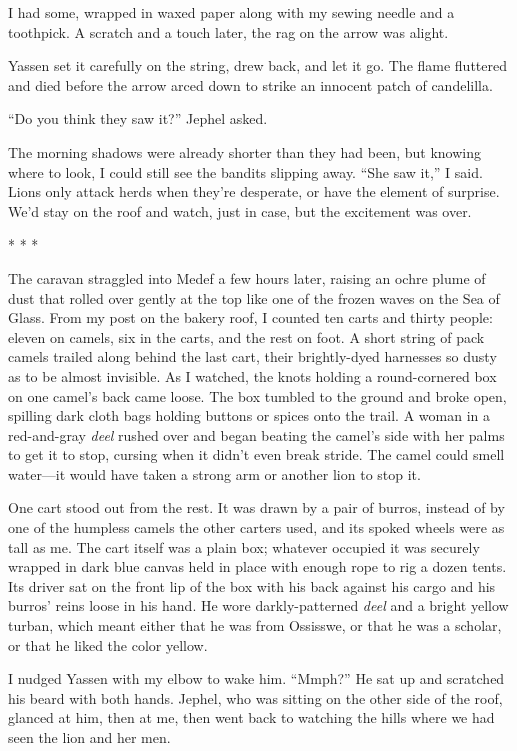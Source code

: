 I had some, wrapped in waxed paper along with my sewing needle and a
toothpick.  A scratch and a touch later, the rag on the arrow was
alight.

Yassen set it carefully on the string, drew back, and let it go.  The
flame fluttered and died before the arrow arced down to strike an
innocent patch of candelilla.

``Do you think they saw it?'' Jephel asked.

The morning shadows were already shorter than they had been, but
knowing where to look, I could still see the bandits slipping away.
``She saw it,'' I said.  Lions only attack herds when they're desperate,
or have the element of surprise.  We'd stay on the roof and watch,
just in case, but the excitement was over.

\begin{center}* * *\end{center}

The caravan straggled into Medef a few hours later, raising an ochre
plume of dust that rolled over gently at the top like one of the
frozen waves on the Sea of Glass.  From my post on the bakery roof, I
counted ten carts and thirty people: eleven on camels, six in the
carts, and the rest on foot.  A short string of pack camels trailed
along behind the last cart, their brightly-dyed harnesses so dusty as
to be almost invisible.  As I watched, the knots holding a
round-cornered box on one camel's back came loose.  The box tumbled to
the ground and broke open, spilling dark cloth bags holding buttons or
spices onto the trail.  A woman in a red-and-gray \emph{deel} rushed over
and began beating the camel's side with her palms to get it to stop,
cursing when it didn't even break stride.  The camel could smell
water---it would have taken a strong arm or another lion to stop it.

One cart stood out from the rest.  It was drawn by a pair of burros,
instead of by one of the humpless camels the other carters used, and
its spoked wheels were as tall as me.  The cart itself was a plain
box; whatever occupied it was securely wrapped in dark blue canvas
held in place with enough rope to rig a dozen tents.  Its driver sat
on the front lip of the box with his back against his cargo and his
burros' reins loose in his hand.  He wore darkly-patterned \emph{deel} and
a bright yellow turban, which meant either that he was from Ossisswe,
or that he was a scholar, or that he liked the color yellow.

I nudged Yassen with my elbow to wake him.  ``Mmph?''  He sat up and
scratched his beard with both hands.  Jephel, who was sitting on the
other side of the roof, glanced at him, then at me, then went back to
watching the hills where we had seen the lion and her men.

